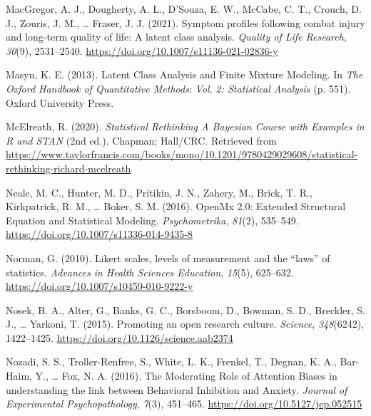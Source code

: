 \documentclass[
  ,man,floatsintext]{apa6}
\newlength{\cslhangindent}
\newlength{\cslentryspacingunit} %
\newenvironment{CSLReferences}[2] %
 {%
  \setlength{\parindent}{0pt}
  \ifodd #1
  \let\oldpar\par
  \def\par{\hangindent=\cslhangindent\oldpar}
  \fi
  \setlength{\parskip}{#2\cslentryspacingunit}
 }%
 {}
\begin{document}
\begin{CSLReferences}{1}{0}
\leavevmode{}%
MacGregor, A. J., Dougherty, A. L., D'Souza, E. W., McCabe, C. T., Crouch, D. J., Zouris, J. M., \ldots{} Fraser, J. J. (2021). Symptom profiles following combat injury and long-term quality of life: A latent class analysis. \emph{Quality of Life Research}, \emph{30}(9), 2531--2540. \url{https://doi.org/10.1007/s11136-021-02836-y}

\leavevmode{}%
Masyn, K. E. (2013). Latent {Class} {Analysis} and {Finite} {Mixture} {Modeling}. In \emph{The {Oxford} {Handbook} of {Quantitative} {Methods}}: \emph{Vol.} \emph{2: Statistical Analysis} (p. 551). Oxford University Press.

\leavevmode{}%
McElreath, R. (2020). \emph{Statistical {Rethinking} {\textbar} {A} {Bayesian} {Course} with {Examples} in {R} and {STAN}} (2nd ed.). Chapman; Hall/CRC. Retrieved from \url{https://www.taylorfrancis.com/books/mono/10.1201/9780429029608/statistical-rethinking-richard-mcelreath}

\leavevmode{}%
Neale, M. C., Hunter, M. D., Pritikin, J. N., Zahery, M., Brick, T. R., Kirkpatrick, R. M., \ldots{} Boker, S. M. (2016). {OpenMx} 2.0: {Extended} {Structural} {Equation} and {Statistical} {Modeling}. \emph{Psychometrika}, \emph{81}(2), 535--549. \url{https://doi.org/10.1007/s11336-014-9435-8}

\leavevmode{}%
Norman, G. (2010). Likert scales, levels of measurement and the {``laws''} of statistics. \emph{Advances in Health Sciences Education}, \emph{15}(5), 625--632. \url{https://doi.org/10.1007/s10459-010-9222-y}

\leavevmode{}%
Nosek, B. A., Alter, G., Banks, G. C., Borsboom, D., Bowman, S. D., Breckler, S. J., \ldots{} Yarkoni, T. (2015). Promoting an open research culture. \emph{Science}, \emph{348}(6242), 1422--1425. \url{https://doi.org/10.1126/science.aab2374}

\leavevmode{}%
Nozadi, S. S., Troller-Renfree, S., White, L. K., Frenkel, T., Degnan, K. A., Bar-Haim, Y., \ldots{} Fox, N. A. (2016). The {Moderating} {Role} of {Attention} {Biases} in understanding the link between {Behavioral} {Inhibition} and {Anxiety}. \emph{Journal of Experimental Psychopathology}, \emph{7}(3), 451--465. \url{https://doi.org/10.5127/jep.052515}


\end{CSLReferences}
\end{document}
